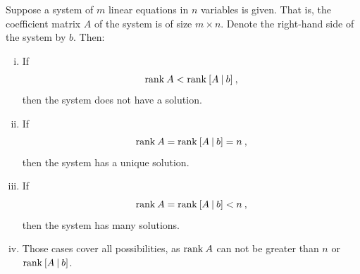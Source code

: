 \begin{theorem}
\label{thm:rank_sols}
Suppose a system of $m$ linear equations in $n$ variables is given. That is, the coefficient matrix $A$ of the system is of size $m \times n$. Denote the right-hand side of the system by $b$. Then:
\begin{enumerate}[(i)]
\item If	
\[ \text{rank}\: A < \text{rank}\: [A\:|\:b] \:, \]	
then the system does not have a solution.
\item If	
\[ \text{rank}\: A = \text{rank}\: [A\:|\:b]  = n \:, \]	
then the system has a unique solution.
\item If	
\[ \text{rank}\: A = \text{rank}\: [A\:|\:b] < n \:, \]	
then the system has many solutions.
\item Those cases cover all possibilities, as $\text{rank}\: A$ can not be greater than $n$ or $\text{rank}\: [A\:|\:b]$.
\end{enumerate}
\end{theorem}

